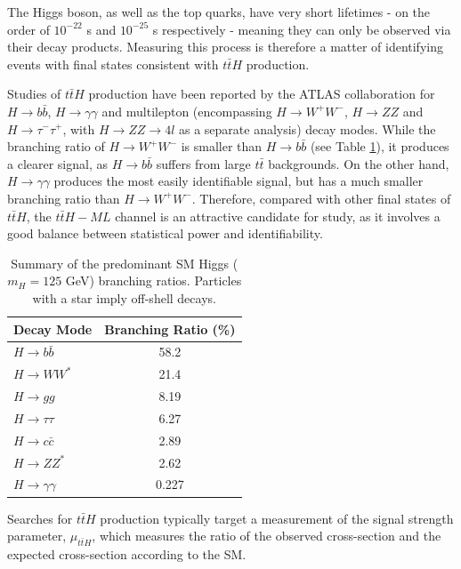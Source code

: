 The Higgs boson, as well as the top quarks, have very short lifetimes - on the order of $10^{-22}$ s and $10^{-25}$ s respectively - meaning they can only be observed via their decay products. Measuring this process is therefore a matter of identifying events with final states consistent with $t\bar{t}H$ production. 

Studies of $t\bar{t}H$ production have been reported by the ATLAS collaboration for $H\rightarrow b\bar{b}$, $H\rightarrow \gamma\gamma$ and multilepton (encompassing $H\rightarrow W^+W^-$, $H\rightarrow ZZ$ and $H\rightarrow \tau^-\tau^+$, with $H\rightarrow ZZ\rightarrow 4l$ as a separate analysis) decay modes. While the branching ratio of $H\rightarrow W^+W^-$ is smaller than $H \rightarrow b \bar{b}$ (see Table \ref{tab:H_BR}), it produces a clearer signal, as $H \rightarrow b \bar{b}$ suffers from large $t\bar{t}$ backgrounds. On the other hand, $H\rightarrow \gamma\gamma$ produces the most easily identifiable signal, but has a much smaller branching ratio than $H\rightarrow W^+W^-$. Therefore, compared with other final states of $t\bar{t}H$, the $t\bar{t}H-ML$ channel is an attractive candidate for study, as it involves a good balance between statistical power and identifiability. 

\begin{table}[H]
\centering
\begin{tabular}{lc}
\hline\hline
Decay Mode & Branching Ratio (\%) \\
\hline
$H \rightarrow b \bar{b}$ & 58.2 \\
$H\rightarrow WW^*$ & 21.4 \\
$H\rightarrow gg$ & 8.19 \\
$H\rightarrow \tau\tau$ & 6.27 \\
$H\rightarrow c\bar{c}$ & 2.89 \\
$H\rightarrow ZZ^*$ & 2.62 \\
$H\rightarrow \gamma\gamma$ & 0.227 \\
\hline
\end{tabular}
\label{tab:H_BR}
\caption{Summary of the predominant SM Higgs ($m_H = 125$ GeV) branching ratios. Particles with a star imply off-shell decays.}
\end{table} 

Searches for $t\bar{t}H$ production typically target a measurement of the signal strength parameter, $\mu_{t\bar{t}H}$, which measures the ratio of the observed cross-section and the expected cross-section according to the SM.

